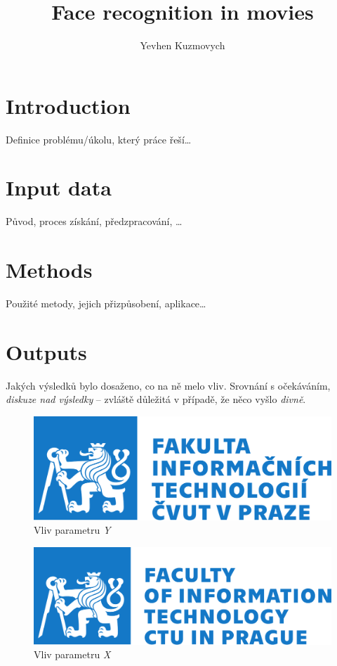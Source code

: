 \documentclass[english]{mvi-report}
\title{Face recognition in movies}
\author{Yevhen Kuzmovych}
\affiliation{ČVUT - FIT}
\begin{document}
\maketitle

\section{Introduction}
Definice problému/úkolu, který práce řeší\ldots


\section{Input data}
Původ, proces získání, předzpracování, \ldots

\section{Methods}
Použité metody, jejich přizpůsobení, aplikace\ldots

\section{Outputs}

Jakých výsledků bylo dosaženo, co na ně melo vliv. Srovnání s očekáváním, \emph{diskuze nad výsledky} -- zvláště důležitá v případě, že něco vyšlo \emph{divně}.

\begin{figure}[h]
  \centering\leavevmode
  \includegraphics[width=.45\linewidth]{img/fit-logo-cz.pdf}\vskip-0.5cm
  \caption{Vliv parametru \emph{Y}}
  \label{fig:par-y}
\end{figure}
\begin{figure}[h]
  \centering\leavevmode
  \includegraphics[width=.45\linewidth]{img/fit-logo-en.pdf}\vskip-0.5cm
  \caption{Vliv parametru \emph{X}}
  \label{fig:par-x}
\end{figure}
\end{document}
